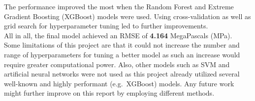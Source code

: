 \documentclass[
]{article}
\begin{document}
The performance improved the most when the Random Forest and Extreme
Gradient Boosting (XGBoost) models were used. Using cross-validation as
well as grid search for hyperparameter tuning led to further
improvements.\\

All in all, the final model achieved an RMSE of \textbf{4.164}
MegaPascals (MPa).\\

Some limitations of this project are that it could not increase the
number and range of hyperparameters for tuning a better model as such an
increase would require greater computational power. Also, other models
such as SVM and artificial neural networks were not used as this project
already utilized several well-known and highly performant (e.g.~XGBoost)
models. Any future work might further improve on this report by
employing different methods.
\end{document}
